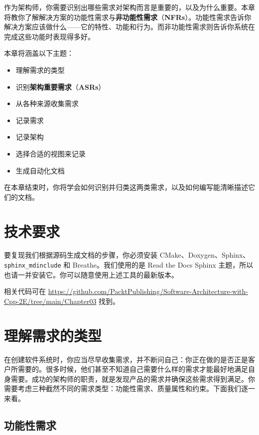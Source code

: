 \label{idx:137}
作为架构师，你需要识别出哪些需求对架构而言是重要的，以及为什么重要。本章将教你了解解决方案的功能性需求与\textbf{非功能性需求}（\textbf{NFRs}）。功能性需求告诉你解决方案应该做什么——它的特性、功能和行为。而非功能性需求则告诉你系统在完成这些功能时表现得多好。

本章将涵盖以下主题：

\begin{itemize}
\label{idx:138}
\item 理解需求的类型
\item 识别\textbf{架构重要需求}（\textbf{ASRs}）
\item 从各种来源收集需求
\item 记录需求
\item 记录架构
\item 选择合适的视图来记录
\item 生成自动化文档
\end{itemize}

在本章结束时，你将学会如何识别并归类这两类需求，以及如何编写能清晰描述它们的文档。

\section{技术要求}

要复现我们根据源码生成文档的步骤，你必须安装 CMake、Doxygen、Sphinx、\texttt{sphinx\_\allowbreak{}mdinclude} 和 Breathe。我们使用的是 Read the Docs Sphinx 主题，所以也请一并安装它。你可以随意使用上述工具的最新版本。

相关代码可在 \href{https://github.com/PacktPublishing/Software-Architecture-with-Cpp-2E/tree/main/Chapter03}{https://github.com/PacktPublishing/Software-Architecture-with-Cpp-2E/tree/main/Chapter03} 找到。

\section{理解需求的类型}

在创建软件系统时，你应当尽早收集需求，并不断问自己：你正在做的是否正是客户所需要的。很多时候，他们甚至不知道自己需要什么样的需求才能最好地满足自身需要。成功的架构师的职责，就是发现产品的需求并确保这些需求得到满足。你需要考虑三种截然不同的需求类型：功能性需求、质量属性和约束。下面我们逐一来看。

\subsection{功能性需求}

